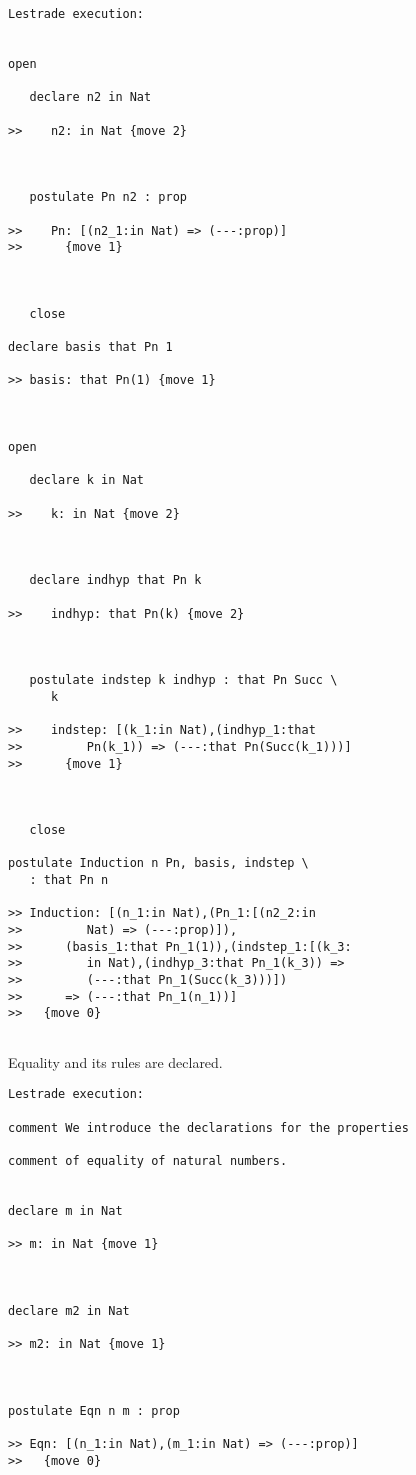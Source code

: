 \documentclass[12pt]{article}
\begin{document}
\begin{verbatim}Lestrade execution:


open

   declare n2 in Nat

>>    n2: in Nat {move 2}



   postulate Pn n2 : prop

>>    Pn: [(n2_1:in Nat) => (---:prop)]
>>      {move 1}



   close

declare basis that Pn 1

>> basis: that Pn(1) {move 1}



open

   declare k in Nat

>>    k: in Nat {move 2}



   declare indhyp that Pn k

>>    indhyp: that Pn(k) {move 2}



   postulate indstep k indhyp : that Pn Succ \
      k

>>    indstep: [(k_1:in Nat),(indhyp_1:that
>>         Pn(k_1)) => (---:that Pn(Succ(k_1)))]
>>      {move 1}



   close

postulate Induction n Pn, basis, indstep \
   : that Pn n

>> Induction: [(n_1:in Nat),(Pn_1:[(n2_2:in
>>         Nat) => (---:prop)]),
>>      (basis_1:that Pn_1(1)),(indstep_1:[(k_3:
>>         in Nat),(indhyp_3:that Pn_1(k_3)) =>
>>         (---:that Pn_1(Succ(k_3)))])
>>      => (---:that Pn_1(n_1))]
>>   {move 0}


\end{verbatim}

Equality and its rules are declared.

\begin{verbatim}Lestrade execution:

comment We introduce the declarations for the properties

comment of equality of natural numbers.


declare m in Nat

>> m: in Nat {move 1}



declare m2 in Nat

>> m2: in Nat {move 1}



postulate Eqn n m : prop

>> Eqn: [(n_1:in Nat),(m_1:in Nat) => (---:prop)]
>>   {move 0}


\end{verbatim}
\end{document}
